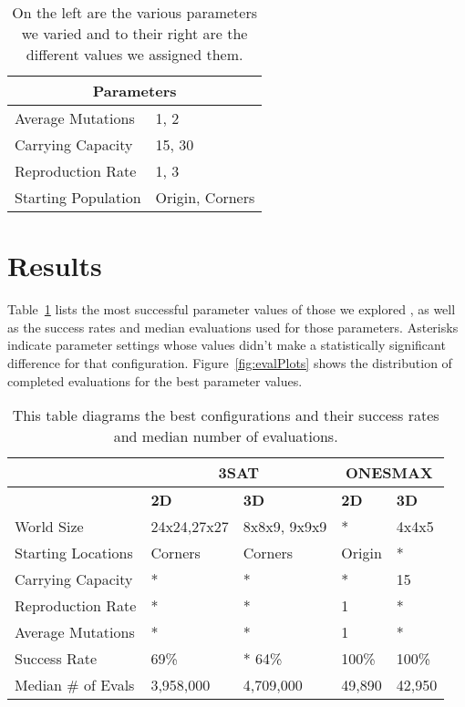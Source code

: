 \documentclass[12pt]{article}
\begin{document}
\begin{table}[tb]
\begin{center}
\begin{tabular}{|l|l|}
	\hline
	\multicolumn{2}{|c|}{Parameters} \\
	\hline
	Average Mutations & 1, 2 \\
	Carrying Capacity & 15, 30 \\
	Reproduction Rate & 1, 3 \\
	Starting Population & Origin, Corners \\
	\hline
\end{tabular}
\caption{On the left are the various parameters we varied and to their right are the different values we assigned them.}
\label{tab:parameters}
\end{center}
\end{table}


\section{Results} \label{sec:results}

Table~\ref{tab:parameters} lists the most successful parameter values of those we explored , as well as the success rates and median evaluations used for those parameters. Asterisks indicate parameter settings whose values didn't make a statistically significant difference for that configuration. Figure~\ref{fig:evalPlots} shows the distribution of completed evaluations for the best parameter values.

\begin{table}[tb]
\begin{center}
\begin{tabular}{|l||l|l||l|l|}
	\hline
	& \multicolumn{2}{|c||}{3SAT} & \multicolumn{2}{|c|}{ONESMAX} \\
	\hline
	& \textbf{2D} & \textbf{3D} & \textbf{2D} & \textbf{3D} \\ \hline
	World Size & 24x24,27x27 & 8x8x9, 9x9x9 & * & 4x4x5 \\
	Starting Locations & Corners & Corners & Origin & * \\
	Carrying Capacity & * & * &	* & 15 \\
	Reproduction Rate & * & * & 1 & * \\
	Average Mutations & * & * & 1 & * \\
	Success Rate &	69\% & * 64\% & 100\% & 100\% \\
	Median \# of Evals & 3,958,000 & 4,709,000 & 49,890 & 42,950 \\
	\hline
\end{tabular}
\caption{This table diagrams the best configurations and their success rates and median number of evaluations.}
\label{tab:results}
\end{center}
\end{table}
\end{document}
